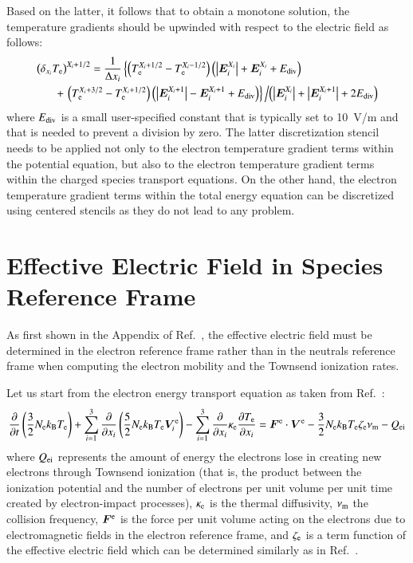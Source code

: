 \documentclass{warpdoc}
\newcommand{\alb}{\vspace{0.2cm}\\} %
\newcommand{\mfd}{\displaystyle}
\newcommand{\nd}{3}
\renewcommand{\vec}[1]{\bm{#1}}
\begin{document}
Based on the latter, it follows that to obtain a monotone solution, the temperature gradients should be upwinded with respect to the electric field as follows:
%
\begin{align}
  &\left(\delta_{x_i} T_{\rm e}\right)^{X_i+1/2}
  = \frac{1}{\Delta x_i}\left\{ \left(T_{\rm e}^{X_i+1/2}-T_{\rm e}^{X_i-1/2} \right) \left(  \big|\vec{E}_i^{X_i}\big|+\vec{E}_i^{X_i}+E_{\rm div}\right) \right.\nonumber\alb\mfd
              &~~~~~~~+\left.\left(T_{\rm e}^{X_i+3/2}-T_{\rm e}^{X_i+1/2} \right)\left(\big|\vec{E}_i^{X_i+1}\big|-\vec{E}_i^{X_i+1}+E_{\rm div}\right)
        \right\}\left/  \left(\big| \vec{E}_i^{X_i}\big|+\big|\vec{E}_i^{X_i+1}\big|+2 E_{\rm div}\right)\right. 
\end{align}
% 
where $E_{\rm div}$ is a small user-specified constant that is typically set to 10~V/m and that is needed to prevent a division by zero. The latter discretization stencil needs to be applied not only to the electron temperature gradient terms within the potential equation, but also to the electron temperature gradient terms within the charged species transport equations. On the other hand, the electron temperature gradient terms within the total energy equation can be discretized using centered stencils as they do not lead to any problem.





\section{Effective Electric Field in Species Reference Frame}


As first shown in the Appendix of Ref.\ \cite{jcp:2015:parent}, the effective electric field must be determined in the electron reference frame rather than in the neutrals reference frame when computing the electron mobility and the Townsend ionization rates. 

Let us start from the electron energy transport equation as taken from Ref.\ \cite[page 34]{book:1991:raizer}:
%
\begin{equation}
  \frac{\partial }{\partial t} \left( \frac{3}{2} N_{\rm e} k_{\rm B} T_{\rm e} \right)
  + \sum_{i=1}^\nd \frac{\partial }{\partial x_i} \left(\frac{5}{2}  N_{\rm e} k_{\rm B} T_{\rm e} \vec{V}_i^{\rm e} \right)
  - \sum_{i=1}^\nd \frac{\partial }{\partial x_i} \kappa_{\rm e} \frac{\partial T_{\rm e}}{\partial x_i}
  =
   \vec{F}^{\rm e}\cdot \vec{V}^{\rm e}
 - \frac{3}{2} N_{\rm e} k_{\rm B} T_{\rm e} \zeta_{\rm e} \nu_{\rm m} - Q_{\rm ei}  
 \end{equation}
%
where $Q_{\rm ei}$ represents the amount of energy the electrons lose in creating new electrons through Townsend
ionization (that is, the product between the ionization potential and the number of electrons per unit volume per unit time created by electron-impact processes), $\kappa_{\rm e}$ is the thermal diffusivity, $\nu_{\rm m}$ the collision frequency, $\vec{F}^{\rm e}$ is the force per unit volume acting on the electrons due to electromagnetic fields in the electron reference frame, and $\zeta_{\rm e}$ is a term function of the effective electric field which can be determined similarly as in Ref.\ \cite{misc:1995:boeuf}.
\end{document}
